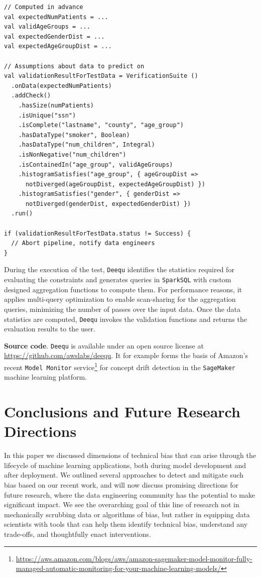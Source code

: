 \documentclass[11pt]{article}
\newcommand{\deequ}{\stt{Deequ}\xspace}
\newcommand{\header}[1]{\vspace{1mm}\noindent\textbf{#1}.}
\newcommand{\surl}[1]{{\footnotesize\url{#1}}}
\newcommand{\stt}[1]{{\footnotesize\texttt{#1}}}
\begin{document}
\begin{lstlisting}[style=myScalastyle, caption={Example of a data unit test.}, captionpos="b", label={lst:deequ}]
// Computed in advance
val expectedNumPatients = ...
val validAgeGroups = ...
val expectedGenderDist = ...
val expectedAgeGroupDist = ...

// Assumptions about data to predict on
val validationResultForTestData = VerificationSuite ()
  .onData(expectedNumPatients)
  .addCheck()
    .hasSize(numPatients)
    .isUnique("ssn")
    .isComplete("lastname", "county", "age_group")
    .hasDataType("smoker", Boolean)
    .hasDataType("num_children", Integral)
    .isNonNegative("num_children")    
    .isContainedIn("age_group", validAgeGroups)
    .histogramSatisfies("age_group", { ageGroupDist => 
      notDiverged(ageGroupDist, expectedAgeGroupDist) })
    .histogramSatisfies("gender", { genderDist => 
      notDiverged(genderDist, expectedGenderDist) })    
  .run()

if (validationResultForTestData.status != Success) {
  // Abort pipeline, notify data engineers
}
\end{lstlisting}

During the execution of the test, \deequ identifies the statistics required for evaluating the constraints and generates queries  in  \stt{SparkSQL} with  custom  designed  aggregation  functions to compute them. For performance reasons, it applies multi-query optimization to enable scan-sharing for the aggregation queries, minimizing the number of passes over the input data. Once the data statistics are computed, \deequ invokes the validation functions and returns the evaluation results to the user. 

\header{Source code} \deequ is available under an open source license at \surl{https://github.com/awslabs/deequ}. It for example forms the basis of Amazon's recent \stt{Model~Monitor} service\footnote{\tiny\url{https://aws.amazon.com/blogs/aws/amazon-sagemaker-model-monitor-fully-managed-automatic-monitoring-for-your-machine-learning-models/}} for concept drift detection in the \stt{SageMaker} machine learning platform.


\section{Conclusions and Future Research Directions}
\label{sec:conc}

In this paper we discussed dimensions of technical bias that can arise through the lifecycle of machine learning applications, both during model development and after deployment. We outlined several approaches to detect and mitigate such bias based on our recent work, and will now discuss promising directions for future research, where the data engineering community has the potential to make significant impact.  We see the overarching goal of this line of research not in mechanically scrubbing data or algorithms of bias, but rather in equipping  data scientists with tools that can help them identify technical bias, understand any trade-offs, and thoughtfully enact interventions.
\end{document}
